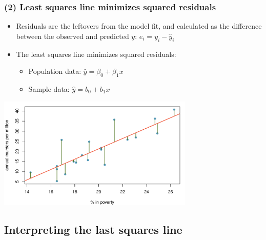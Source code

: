 \documentclass[slidestop,compress,mathserif,12pt,t,professionalfonts,xcolor=table]{beamer}
\begin{document}
\begin{frame}
\frametitle{(2) Least squares line minimizes squared residuals}

\begin{itemize}

\item Residuals are the leftovers from the model fit, and calculated as the difference between the observed and predicted $y$: $e_i = y_i - \hat{y}_i$

\item The least squares line minimizes squared residuals:
\begin{itemize}
\item Population data: $\hat{y} = \beta_0 + \beta_1 x$
\item Sample data: $\hat{y} = b_0 + b_1 x$
\end{itemize}

\end{itemize}

\begin{center}
\includegraphics[width=0.7\textwidth]{figures/murder/annual_murders_per_mil_perc_pov_res}
\end{center}

\end{frame}


\subsection{Interpreting the last squares line}
\label{mi3}

\end{document}
